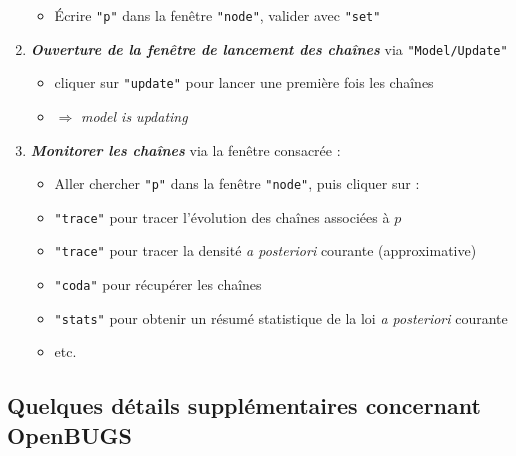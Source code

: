 \begin{enumerate}
\begin{itemize}
\item \'Ecrire \texttt{"p"} dans la fenêtre \texttt{"node"}, valider avec \texttt{"set"}
\end{itemize}
\item  \emph{\bf Ouverture de la fenêtre de lancement des chaînes} via \texttt{"Model/Update"}
\begin{itemize}
\item cliquer sur \texttt{"update"} pour lancer une première fois les chaînes  
\item  $\Rightarrow$ \emph{model is updating}
\end{itemize}
\item \emph{\bf  Monitorer les chaînes} via la fenêtre consacrée :
\begin{itemize}
\item Aller chercher \texttt{"p"} dans la fenêtre \texttt{"node"}, puis cliquer sur :
\item \scriptsize  \texttt{"trace"} pour tracer l'évolution des chaînes associées à $p$
\item \scriptsize \texttt{"trace"} pour tracer la densité {\it a posteriori} courante (approximative)
\item \scriptsize \texttt{"coda"} pour récupérer les chaînes
\item \scriptsize \texttt{"stats"} pour obtenir un résumé statistique de la loi {\it a posteriori} courante 
\item  \scriptsize  etc.
\end{itemize}
\end{enumerate}


\subsection{Quelques détails supplémentaires concernant OpenBUGS}

